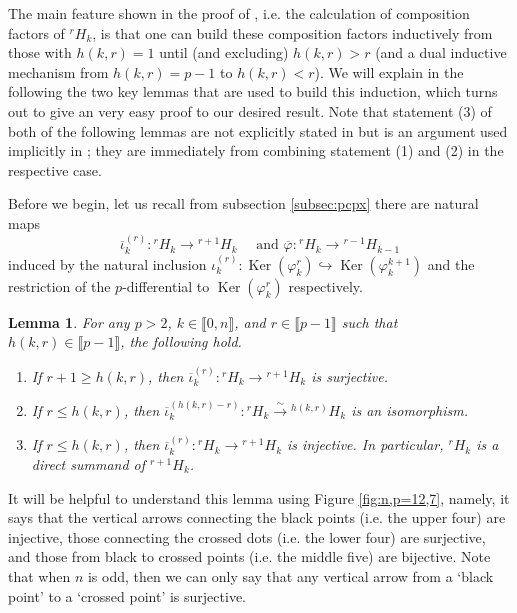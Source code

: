 \documentclass[a4paper]{amsart}
\numberwithin{equation}{subsection}
\newtheorem{lemma}[theorem]{Lemma}
\theoremstyle{definition}
\newcommand{\interval}[1]{\llbracket #1 \rrbracket}
\DeclareMathOperator{\Ker}{\mathrm{Ker}}
\numberwithin{equation}{subsection}
\begin{document}
The main feature shown in the proof of \cite[Theorem 6.9]{BJS}, i.e. the calculation of composition factors of ${}^rH_k$, is that one can build these composition factors inductively from those with $h(k,r)=1$ until (and excluding) $h(k,r)>r$ (and a dual inductive mechanism from $h(k,r)=p-1$ to $h(k,r)<r$).  We will explain in the following the two key lemmas that are used to build this induction, which turns out to give an very easy proof to our desired result.  Note that statement (3) of both of the following lemmas are not explicitly stated in \cite{BJS} but is an argument used implicitly in \cite[Proof of Theorem 6.9]{BJS}; they are immediately from combining statement (1) and (2) in the respective case.

Before we begin, let us recall from subsection \ref{subsec:pcpx} there are natural maps
\[
\overline{\iota}_{k}^{(r)} : {}^rH_k \to {}^{r+1}H_k \quad \text{ and } \overline{\varphi} : {}^rH_k \to {}^{r-1}H_{k-1}
\]
induced by the natural inclusion $\iota_k^{(r)}:\Ker(\varphi_k^r)\hookrightarrow \Ker(\varphi_k^{k+1})$ and the restriction of the $p$-differential to $\Ker(\varphi_k^r)$
respectively.


\begin{lemma}\label{lem:BJS-iota}
For any $p>2$, $k\in\interval{0,n}$, and $r\in\interval{p-1}$ such that $h(k,r)\in\interval{p-1}$, the following hold.
\begin{enumerate}
\item {\rm\cite[Lemma 6.6]{BJS}} If $r+1\geq h(k,r)$, then $\overline{\iota}_{k}^{(r)}: {}^rH_k \to {}^{r+1}H_k$ is surjective.

\item {\rm\cite[Lemma 6.7]{BJS}} If $r\leq h(k,r)$, then $\overline{\iota}_k^{(h(k,r)-r)}: {}^rH_k \xrightarrow{\sim} {}^{h(k,r)}H_k$ is an isomorphism.

\item If $r\leq h(k,r)$, then $\overline{\iota}_k^{(r)}: {}^rH_k \to {}^{r+1}H_k$ is injective.  In particular, ${}^rH_k$ is a direct summand of ${}^{r+1}H_k$.
\end{enumerate}
\end{lemma}

It will be helpful to understand this lemma using Figure \ref{fig:n,p=12,7}, namely, it says that the vertical arrows connecting the black points (i.e. the upper four) are injective, those connecting the crossed dots (i.e. the lower four) are surjective, and those from black to crossed points (i.e. the middle five) are bijective.  Note that when $n$ is odd, then we can only say that any vertical arrow from a `black point' to a `crossed point' is surjective.
\end{document}
